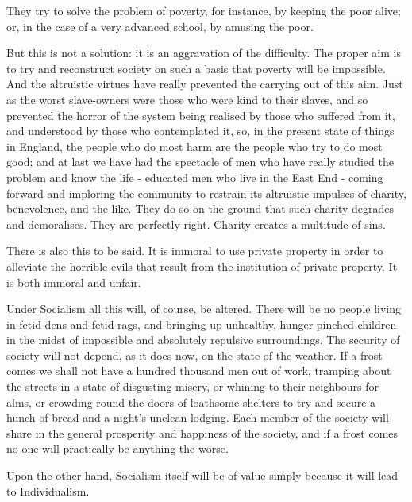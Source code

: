 They try to solve the problem of poverty, for instance, by keeping the poor alive; or, in the case of a very advanced school, by amusing the poor.\par

But this is not a solution: it is an aggravation of the difficulty. The proper aim is to try and reconstruct society on such a basis that poverty will be impossible. And the altruistic virtues have really prevented the carrying out of this aim. Just as the worst slave-owners were those who were kind to their slaves, and so prevented the horror of the system being realised by those who suffered from it, and understood by those who contemplated it, so, in the present state of things in England, the people who do most harm are the people who try to do most good; and at last we have had the spectacle of men who have really studied the problem and know the life - educated men who live in the East End - coming forward and imploring the community to restrain its altruistic impulses of charity, benevolence, and the like. They do so on the ground that such charity degrades and demoralises. They are perfectly right. Charity creates a multitude of sins.\par

There is also this to be said. It is immoral to use private property in order to alleviate the horrible evils that result from the institution of private property. It is both immoral and unfair.\par

Under Socialism all this will, of course, be altered. There will be no people living in fetid dens and fetid rags, and bringing up unhealthy, hunger-pinched children in the midst of impossible and absolutely repulsive surroundings. The security of society will not depend, as it does now, on the state of the weather. If a frost comes we shall not have a hundred thousand men out of work, tramping about the streets in a state of disgusting misery, or whining to their neighbours for alms, or crowding round the doors of loathsome shelters to try and secure a hunch of bread and a night’s unclean lodging. Each member of the society will share in the general prosperity and happiness of the society, and if a frost comes no one will practically be anything the worse.\par

Upon the other hand, Socialism itself will be of value simply because it will lead to Individualism.\par

